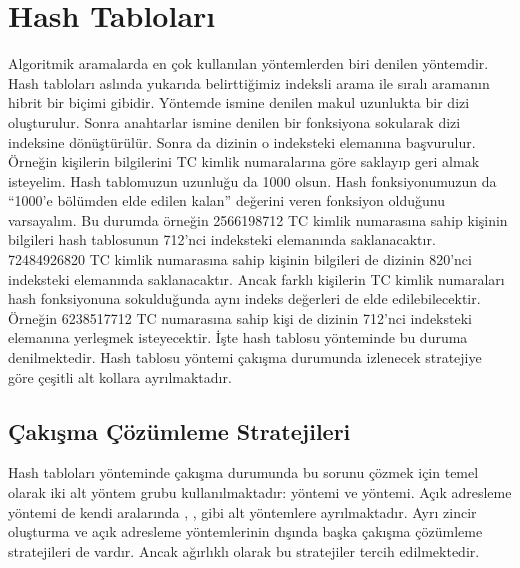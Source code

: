 \documentclass[a4paper,10pt,turkish]{sphinxmanual}
\begin{document}
\section{Hash Tabloları}
\label{\detokenize{kernellinkedlistandhashtable:hash-tablolari}}
\sphinxAtStartPar
Algoritmik aramalarda en çok kullanılan yöntemlerden biri 
denilen yöntemdir. Hash tabloları aslında yukarıda belirttiğimiz indeksli arama ile sıralı
aramanın hibrit bir biçimi gibidir. Yöntemde ismine  denilen
makul uzunlukta bir dizi oluşturulur. Sonra anahtarlar ismine  denilen bir fonksiyona sokularak dizi indeksine dönüştürülür. Sonra da dizinin
o indeksteki elemanına başvurulur. Örneğin kişilerin bilgilerini TC kimlik numaralarına
göre saklayıp geri almak isteyelim. Hash tablomuzun uzunluğu da 1000 olsun. Hash
fonksiyonumuzun da “1000’e bölümden elde edilen kalan” değerini veren fonksiyon olduğunu
varsayalım. Bu durumda örneğin 2566198712 TC kimlik numarasına sahip kişinin bilgileri
hash tablosunun 712’nci indeksteki elemanında saklanacaktır. 72484926820 TC kimlik
numarasına sahip kişinin bilgileri de dizinin 820’nci indeksteki elemanında
saklanacaktır. Ancak farklı kişilerin TC kimlik numaraları hash fonksiyonuna sokulduğunda
aynı indeks değerleri de elde edilebilecektir. Örneğin 6238517712 TC numarasına sahip
kişi de dizinin 712’nci indeksteki elemanına yerleşmek isteyecektir. İşte hash tablosu
yönteminde bu duruma  denilmektedir. Hash tablosu yöntemi çakışma
durumunda izlenecek stratejiye göre çeşitli alt kollara ayrılmaktadır.


\subsection{Çakışma Çözümleme Stratejileri}
\label{\detokenize{kernellinkedlistandhashtable:cakisma-cozumleme-stratejileri}}
\sphinxAtStartPar
Hash tabloları yönteminde çakışma durumunda bu sorunu çözmek için temel olarak iki alt
yöntem grubu kullanılmaktadır:  yöntemi ve
 yöntemi. Açık adresleme yöntemi de kendi aralarında
, ,  gibi alt yöntemlere ayrılmaktadır. Ayrı zincir oluşturma ve açık
adresleme yöntemlerinin dışında başka çakışma çözümleme stratejileri de vardır. Ancak
ağırlıklı olarak bu stratejiler tercih edilmektedir.
\end{document}
